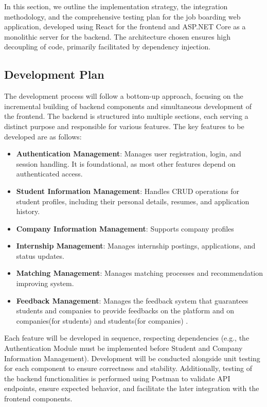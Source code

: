 In this section, we outline the implementation strategy, the integration methodology, and the comprehensive testing plan for the job boarding web application, developed using React for the frontend and ASP.NET Core as a monolithic server for the backend. The architecture chosen ensures high decoupling of code, primarily facilitated by dependency injection.

\subsection{Development Plan}

The development process will follow a bottom-up approach, focusing on the incremental building of backend components and simultaneous development of the frontend. The backend is structured into multiple sections, each serving a distinct purpose and responsible for various features. The key features to be developed are as follows:

\begin{itemize}
    \item \textbf{Authentication Management}: Manages user registration, login, and session handling. It is foundational, as most other features depend on authenticated access.
    \item \textbf{Student Information Management}: Handles CRUD operations for student profiles, including their personal details, resumes, and application history.
    \item \textbf{Company Information Management}: Supports company profiles
    \item \textbf{Internship Management}: Manages internship postings, applications, and status updates.
    \item \textbf{Matching Management}: Manages matching processes and recommendation improving system.
    \item \textbf{Feedback Management}: Manages the feedback system that guarantees students and companies to provide feedbacks on the platform and on companies(for students) and students(for companies)  .
\end{itemize}

Each feature will be developed in sequence, respecting dependencies (e.g., the Authentication Module must be implemented before Student and Company Information Management). Development will be conducted alongside unit testing for each component to ensure correctness and stability. Additionally, testing of the backend functionalities is performed using Postman to validate API endpoints, ensure expected behavior, and facilitate the later integration with the frontend components.

